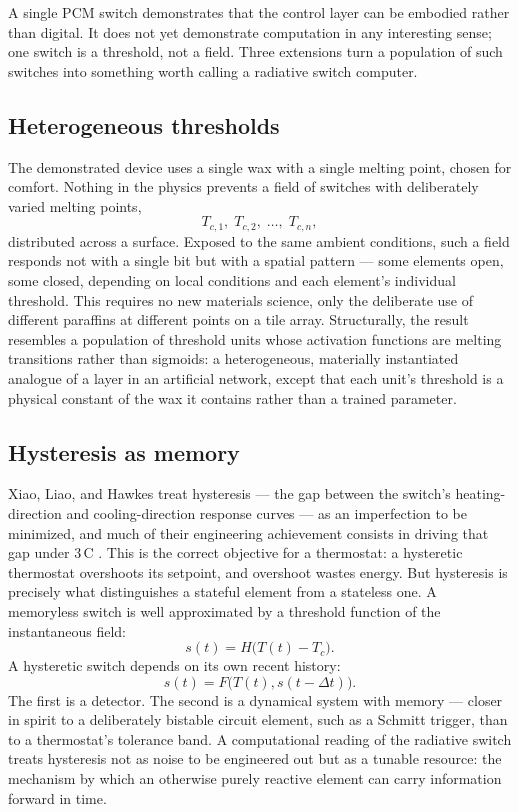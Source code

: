 \documentclass[11pt]{article}
\begin{document}
A single PCM switch demonstrates that the control layer can be embodied rather than digital. It does not yet demonstrate computation in any interesting sense; one switch is a threshold, not a field. Three extensions turn a population of such switches into something worth calling a radiative switch computer.

\subsection{Heterogeneous thresholds}

The demonstrated device uses a single wax with a single melting point, chosen for comfort. Nothing in the physics prevents a field of switches with deliberately varied melting points,
\[
T_{c,1}, \; T_{c,2}, \; \dots, \; T_{c,n},
\]
distributed across a surface. Exposed to the same ambient conditions, such a field responds not with a single bit but with a spatial pattern --- some elements open, some closed, depending on local conditions and each element's individual threshold. This requires no new materials science, only the deliberate use of different paraffins at different points on a tile array. Structurally, the result resembles a population of threshold units whose activation functions are melting transitions rather than sigmoids: a heterogeneous, materially instantiated analogue of a layer in an artificial network, except that each unit's threshold is a physical constant of the wax it contains rather than a trained parameter.

\subsection{Hysteresis as memory}

Xiao, Liao, and Hawkes treat hysteresis --- the gap between the switch's heating-direction and cooling-direction response curves --- as an imperfection to be minimized, and much of their engineering achievement consists in driving that gap under 3\,\textdegree C \cite{xiao2023}. This is the correct objective for a thermostat: a hysteretic thermostat overshoots its setpoint, and overshoot wastes energy. But hysteresis is precisely what distinguishes a stateful element from a stateless one. A memoryless switch is well approximated by a threshold function of the instantaneous field:
\[
s(t) = H\big(T(t) - T_c\big).
\]
A hysteretic switch depends on its own recent history:
\[
s(t) = F\big(T(t), s(t - \Delta t)\big).
\]
The first is a detector. The second is a dynamical system with memory --- closer in spirit to a deliberately bistable circuit element, such as a Schmitt trigger, than to a thermostat's tolerance band. A computational reading of the radiative switch treats hysteresis not as noise to be engineered out but as a tunable resource: the mechanism by which an otherwise purely reactive element can carry information forward in time.
\end{document}
